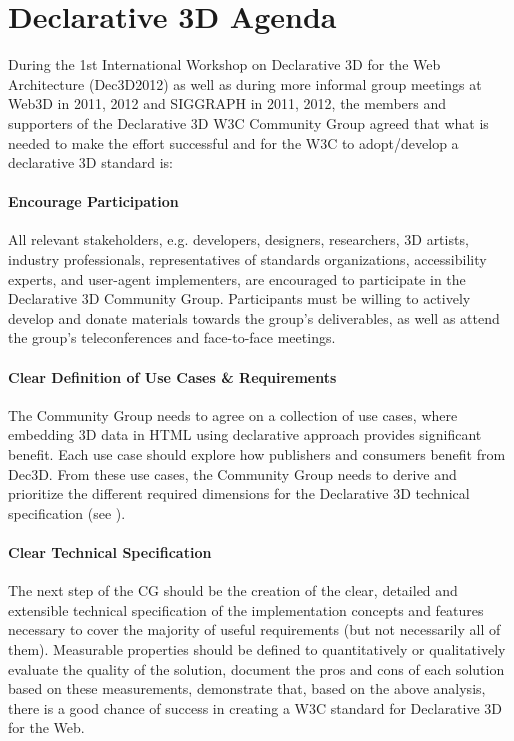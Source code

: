 \documentclass[review]{acmsiggraph}
\begin{document}
\section{Declarative 3D Agenda}

\label{sec:Agenda}
During the 1st International Workshop on Declarative 3D for the Web Architecture (Dec3D2012) \cite{Dec3D2012} as well as during more informal group meetings at Web3D in 2011, 2012 and SIGGRAPH in 2011, 2012, the members and supporters of the Declarative 3D W3C Community Group agreed that what is needed to make the effort successful and for the W3C to adopt/develop a declarative 3D standard is:

\paragraph{Encourage Participation}
All relevant stakeholders, e.g. developers, designers, researchers, 3D artists, industry professionals, representatives of standards organizations, accessibility experts, and user-agent implementers, are encouraged to participate in the Declarative 3D Community Group. Participants must be willing to actively develop and donate materials towards the group's deliverables, as well as attend the group's teleconferences and face-to-face meetings.

\paragraph{Clear Definition of Use Cases \& Requirements}
The Community Group needs to agree on a collection of use cases, where embedding 3D data in HTML using declarative approach provides significant benefit. Each use case should explore how publishers and consumers benefit from Dec3D. From these use cases, the Community Group needs to derive and prioritize the different required dimensions for the Declarative 3D technical specification (see \cite{JankowskiDec3D2012,LeFeuvreDec3D2012}).

\paragraph{Clear Technical Specification}
The next step of the CG should be the creation of the clear, detailed and extensible technical specification of the implementation concepts and features necessary to cover the majority of useful requirements (but not necessarily all of them). Measurable properties should be defined to quantitatively or qualitatively evaluate the quality of the solution, document the pros and cons of each solution based on these measurements, demonstrate that, based on the above analysis, there is a good chance of success in creating a W3C standard for Declarative 3D for the Web.
\end{document}
